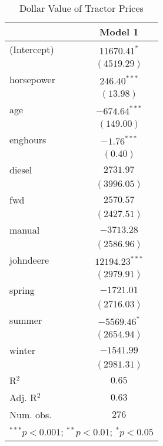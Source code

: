 
\begin{table}
\begin{center}
\begin{tabular}{l c}
\hline
 & Model 1 \\
\hline
(Intercept) & $11670.41^{*}$   \\
            & $(4519.29)$      \\
horsepower  & $246.40^{***}$   \\
            & $(13.98)$        \\
age         & $-674.64^{***}$  \\
            & $(149.00)$       \\
enghours    & $-1.76^{***}$    \\
            & $(0.40)$         \\
diesel      & $2731.97$        \\
            & $(3996.05)$      \\
fwd         & $2570.57$        \\
            & $(2427.51)$      \\
manual      & $-3713.28$       \\
            & $(2586.96)$      \\
johndeere   & $12194.23^{***}$ \\
            & $(2979.91)$      \\
spring      & $-1721.01$       \\
            & $(2716.03)$      \\
summer      & $-5569.46^{*}$   \\
            & $(2654.94)$      \\
winter      & $-1541.99$       \\
            & $(2981.31)$      \\
\hline
R$^2$       & $0.65$           \\
Adj. R$^2$  & $0.63$           \\
Num. obs.   & $276$            \\
\hline
\multicolumn{2}{l}{\scriptsize{$^{***}p<0.001$; $^{**}p<0.01$; $^{*}p<0.05$}}
\end{tabular}
\caption{Dollar Value of Tractor Prices}
\label{tab:price_reg_1}
\end{center}
\end{table}
